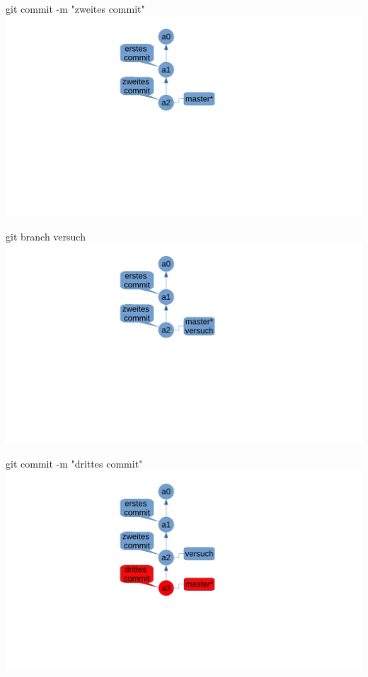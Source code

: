 \documentclass{beamer}
\begin{document}
\begin{frame}{git commit -m "zweites commit"}
    \includegraphics[scale=0.5]{pictures/second_commit.pdf}
\end{frame}

\begin{frame}{git branch versuch}
\includegraphics[scale=0.5]{pictures/branch.pdf}
\end{frame}

\begin{frame}{git commit -m  "drittes commit"}
\includegraphics[scale=0.5]{pictures/third_commit.pdf}
\end{frame}
\end{document}
